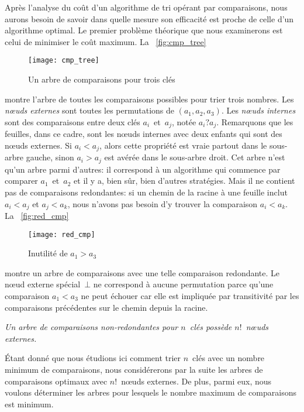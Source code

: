 Après l'analyse du coût d'un algorithme de tri opérant par
comparaisons, nous aurons besoin de savoir dans quelle mesure son
efficacité est proche de celle d'un algorithme
optimal. Le premier problème théorique que
nous examinerons est celui de minimiser le coût maximum. La
\fig~\vref{fig:cmp_tree}
\begin{figure}
\centering
\texttt{[image: cmp\_tree]}
\caption{Un arbre de comparaisons pour trois clés}
\label{fig:cmp_tree}
\end{figure}
montre l'arbre de toutes les comparaisons possibles
 pour trier trois
nombres. Les \emph{n{\oe}uds externes}
\label{def:external_node} sont toutes les
permutations de \((a_1,a_2,a_3)\). Les
\emph{n{\oe}uds internes} sont
des comparaisons entre deux clés \(a_i\)~et~\(a_j\), notée
\(a_i?a_j\). Remarquons que les feuilles, dans ce cadre, sont les
n{\oe}uds internes avec deux enfants qui sont des n{\oe}uds externes.
Si \({a_i < a_j}\), alors cette propriété est vraie partout dans le
sous-arbre gauche, sinon \({a_i > a_j}\) est avérée dans le sous-arbre
droit. Cet arbre n'est qu'un arbre parmi d'autres: il correspond à un
algorithme qui commence par comparer \(a_1\)~et~\(a_2\) et il y a,
bien sûr, bien d'autres stratégies. Mais il ne contient pas de
comparaisons redondantes: si un chemin de la racine à une feuille
inclut \({a_i < a_j}\) et \({a_j < a_k}\), nous n'avons pas besoin d'y
trouver la comparaison \({a_i < a_k}\). La \fig~\vref{fig:red_cmp}
\begin{figure}
\centering
\texttt{[image: red\_cmp]}
\caption{Inutilité de \(a_1 > a_3\)}
\label{fig:red_cmp}
\end{figure}
montre un arbre de comparaisons avec une telle comparaison
redondante. Le n{\oe}ud externe spécial~\(\bot\) ne correspond à
aucune permutation parce qu'une comparaison \({a_1 < a_3}\) ne peut
échouer car elle est impliquée par transitivité par les comparaisons
précédentes sur le chemin depuis la racine.
\begin{center}
  \emph{Un arbre de comparaisons non-redondantes pour \(n\)~clés
    possède \(n!\)~n{\oe}uds externes.}
\end{center}
Étant donné que nous étudions ici comment trier \(n\)~clés avec un
nombre minimum de comparaisons, nous considérerons par la suite les
arbres de comparaisons optimaux avec \(n!\)~n{\oe}uds externes. De
plus, parmi eux, nous voulons déterminer les arbres pour lesquels le
nombre maximum de comparaisons est minimum.

